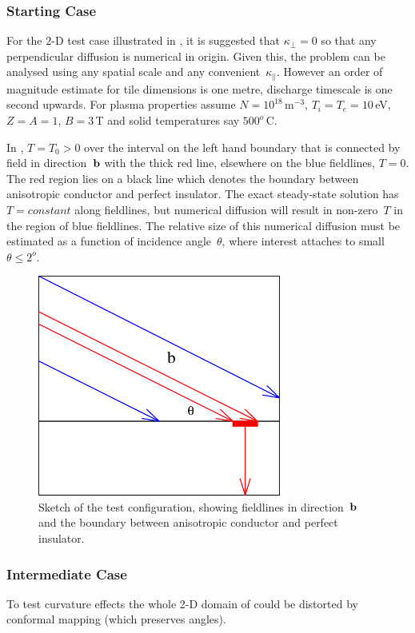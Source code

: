 \subsubsection{Starting Case}\label{sec:start}
For the 2-D test case illustrated in , it is suggested that $\kappa_{\perp}=0$
so that any perpendicular diffusion is numerical in origin. Given this,
the problem can be analysed using any spatial scale and any convenient~$\kappa_{\|}$.
However an order of magnitude estimate for tile dimensions is one metre,
discharge timescale is one second upwards. For plasma properties
assume $N=10^{18}$\,m$^{-3}$, $T_i=T_e=10$\,eV, $Z=A=1$, $B=3$\,T and solid temperatures say $500^o$\,C.

In , $T=T_0>0$ over the interval on the left hand boundary that is connected by field
in direction~${\bf b}$ with the thick red line,
elsewhere on the blue fieldlines, $T=0$. The red region lies on a black line
which denotes the boundary between anisotropic conductor and  perfect insulator. 
The exact steady-state solution has $T=constant$ along fieldlines, but numerical
diffusion will result in non-zero~$T$ in the region of blue fieldlines.
The relative size of this numerical diffusion must be estimated as a function
of incidence angle~$\theta$, where interest attaches to small $\theta\leq2^o$.
\begin{figure}
\centerline{
\includegraphics[width=8.0cm]{../png/aniso.png}
}
\caption{Sketch of the test configuration, showing fieldlines in direction~${\bf b}$
and the boundary between anisotropic conductor and perfect insulator.
\label{fig:aniso}}
\end{figure}

\subsubsection{Intermediate Case}\label{sec:intermediate}
To test curvature effects the whole 2-D domain of  could be distorted by conformal mapping
(which preserves angles).

